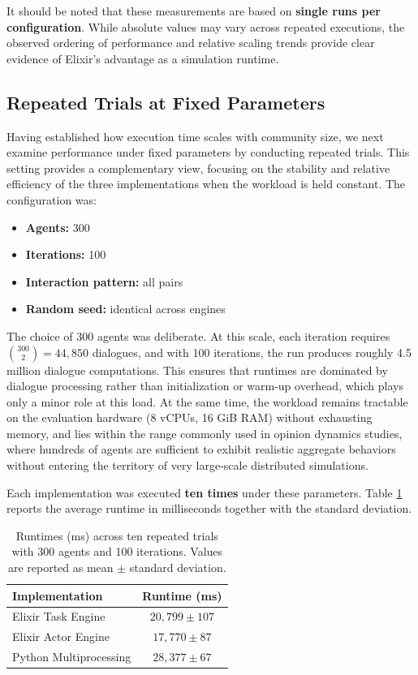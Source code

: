 \documentclass[
]{ceurart}
\begin{document}
It should be noted that these measurements are based on \textbf{single runs per configuration}. While absolute values may vary across repeated executions, the observed ordering of performance and relative scaling trends provide clear evidence of Elixir’s advantage as a simulation runtime.


\subsection{Repeated Trials at Fixed Parameters}
Having established how execution time scales with community size, we next examine performance under fixed parameters by conducting repeated trials. This setting provides a complementary view, focusing on the stability and relative efficiency of the three implementations when the workload is held constant. The configuration was:

\begin{itemize}
	\item \textbf{Agents:} 300
	\item \textbf{Iterations:} 100
	\item \textbf{Interaction pattern:} all pairs
	\item \textbf{Random seed:} identical across engines
\end{itemize}

The choice of 300 agents was deliberate. At this scale, each iteration requires $\binom{300}{2} = 44{,}850$ dialogues, and with 100 iterations, the run produces roughly 4.5 million dialogue computations. This ensures that runtimes are dominated by dialogue processing rather than initialization or warm-up overhead, which plays only a minor role at this load. At the same time, the workload remains tractable on the evaluation hardware (8 vCPUs, 16 GiB RAM) without exhausting memory, and lies within the range commonly used in opinion dynamics studies, where hundreds of agents are sufficient to exhibit realistic aggregate behaviors without entering the territory of very large-scale distributed simulations.


Each implementation was executed \textbf{ten times} under these parameters. Table \ref{tab:runtime_trials} reports the average runtime in milliseconds together with the standard deviation.

\begin{table}[ht]
\centering
\caption{Runtimes (ms) across ten repeated trials with 300 agents and 100 iterations.
Values are reported as mean $\pm$ standard deviation.}
\label{tab:runtime_trials}
\begin{tabular}{lc}
\toprule
Implementation & Runtime (ms) \\
\midrule
Elixir Task Engine & $20,799 \pm 107$ \\
Elixir Actor Engine & $17,770 \pm 87$ \\ 
Python Multiprocessing & $28,377 \pm 67$ \\
\bottomrule
\end{tabular}
\end{table}
\end{document}
